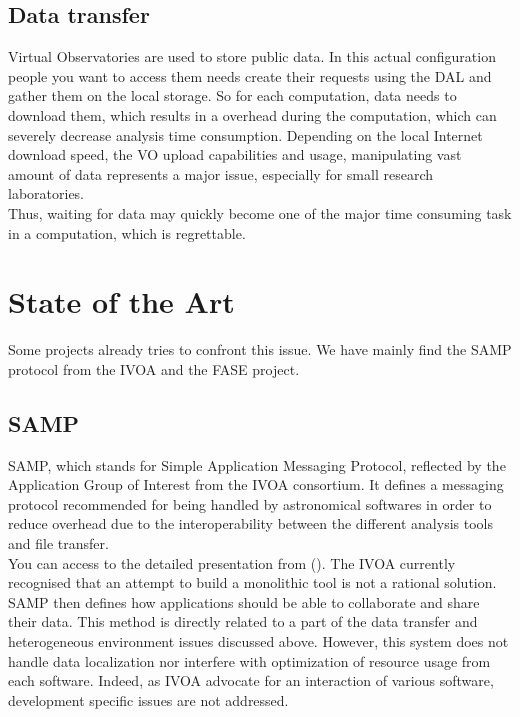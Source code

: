 		\subsection{Data transfer}
			Virtual Observatories are used to store public data. In this actual configuration people you want to access them needs create their requests using the DAL and gather them on the local storage.
			So for each computation, data needs to download them, which results in a overhead during the computation, which can severely decrease analysis time consumption.
			Depending on the local Internet download speed, the VO upload capabilities and usage, manipulating vast amount of data represents a major issue, especially for small research laboratories.
			\\
			Thus, waiting for data may quickly become one of the major time consuming task in a computation, which is regrettable.

	\section{State of the Art}
		Some projects already tries to confront this issue. We have mainly find the SAMP protocol from the IVOA and the FASE project.
		
		\subsection{SAMP}
			SAMP, which stands for Simple Application Messaging Protocol, reflected by the Application Group of Interest from the IVOA consortium.
			It defines a messaging protocol recommended for being handled by astronomical softwares in order to reduce overhead due to the interoperability between the different analysis tools and file transfer.
			\\
			You can access to the detailed presentation from (\cite{Taylor}). The IVOA currently recognised that an attempt to build a monolithic tool is not a rational solution. SAMP then defines how applications should be able to collaborate and share their data.
			This method is directly related to a part of the data transfer and heterogeneous environment issues discussed above.
			However, this system does not handle data localization nor interfere with optimization of resource usage from each software.
			Indeed, as IVOA advocate for an interaction of various software, development specific issues are not addressed. 
			
